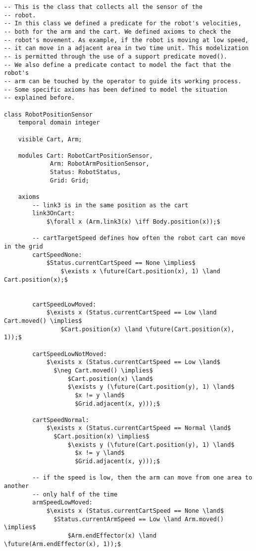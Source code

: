 \begin{lstlisting}[fontadjust, mathescape, frame=single] 
-- This is the class that collects all the sensor of the
-- robot.
-- In this class we defined a predicate for the robot's velocities,
-- both for the arm and the cart. We defined axioms to check the
-- robot's movement. As example, if the robot is moving at low speed,
-- it can move in a adjacent area in two time unit. This modelization
-- is permitted through the use of a support predicate moved().
-- We also define a predicate contact to model the fact that the robot's
-- arm can be touched by the operator to guide its working process.
-- Some specific axioms has been defined to model the situation
-- explained before.

class RobotPositionSensor
    temporal domain integer

    visible Cart, Arm;

    modules Cart: RobotCartPositionSensor,
             Arm: RobotArmPositionSensor,
             Status: RobotStatus,
             Grid: Grid;

    axioms
        -- link3 is in the same position as the cart
        link3OnCart: 
            $\forall x (Arm.link3(x) \iff Body.position(x));$

        -- cartTargetSpeed defines how often the robot cart can move in the grid
        cartSpeedNone: 
            $Status.currentCartSpeed == None \implies$ 
                $\exists x \future(Cart.position(x), 1) \land Cart.position(x);$

                
        cartSpeedLowMoved: 
            $\exists x (Status.currentCartSpeed == Low \land Cart.moved() \implies$
                $Cart.position(x) \land \future(Cart.position(x), 1));$

        cartSpeedLowNotMoved: 
            $\exists x (Status.currentCartSpeed == Low \land$
              $\neg Cart.moved() \implies$
                  $Cart.position(x) \land$ 
                  $\exists y (\future(Cart.position(y), 1) \land$ 
                    $x != y \land$ 
                    $Grid.adjacent(x, y)));$

        cartSpeedNormal: 
            $\exists x (Status.currentCartSpeed == Normal \land$
              $Cart.position(x) \implies$
                  $\exists y (\future(Cart.position(y), 1) \land$
                    $x != y \land$
                    $Grid.adjacent(x, y)));$

        -- if the speed is low, then the arm can move from one area to another
        -- only half of the time
        armSpeedLowMoved: 
            $\exists x (Status.currentCartSpeed == None \land$
              $Status.currentArmSpeed == Low \land Arm.moved() \implies$ 
                  $Arm.endEffector(x) \land \future(Arm.endEffector(x), 1));$


\end{lstlisting}
